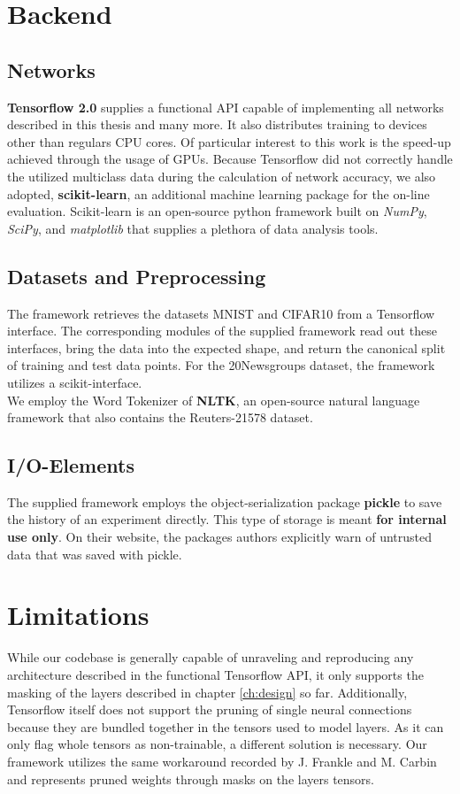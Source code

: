 
\section{Backend}

\subsection{Networks}
\textbf{Tensorflow 2.0} supplies a functional API capable of implementing all networks described in this thesis and many more. It also distributes training to devices other than regulars CPU cores.\cite{Tensorflow} Of particular interest to this work is the speed-up achieved through the usage of GPUs.
Because Tensorflow did not correctly handle the utilized multiclass data during the calculation of network accuracy, we also adopted, \textbf{scikit-learn}, an additional machine learning package for the on-line evaluation. 
Scikit-learn is an open-source python framework built on \textit{NumPy}, \textit{SciPy}, and \textit{matplotlib} that supplies a plethora of data analysis tools.\cite{scikit-learn}

\subsection{Datasets and Preprocessing}
The framework retrieves the datasets MNIST and CIFAR10 from a Tensorflow interface. The corresponding modules of the supplied framework read out these interfaces, bring the data into the expected shape, and return the canonical split of training and test data points. 
For the 20Newsgroups dataset, the framework utilizes a scikit-interface.\\
We employ the Word Tokenizer of \textbf{NLTK}, an open-source natural language framework that also contains the Reuters-21578 dataset.\cite{NLTK}

\subsection{I/O-Elements}
The supplied framework employs the object-serialization package \textbf{pickle} to save the history of an experiment directly. This type of storage is meant \textbf{for internal use only}. On their website, the packages authors explicitly warn of untrusted data that was saved with pickle.

\section{Limitations}
While our codebase is generally capable of unraveling and reproducing any architecture described in the functional Tensorflow API, it only supports the masking of the layers described in chapter \ref{ch:design} so far. Additionally, Tensorflow itself does not support the pruning of single neural connections because they are bundled together in the tensors used to model layers. As it can only flag whole tensors as non-trainable, a different solution is necessary. Our framework utilizes the same workaround recorded by J. Frankle and M. Carbin and represents pruned weights through masks on the layers tensors.
